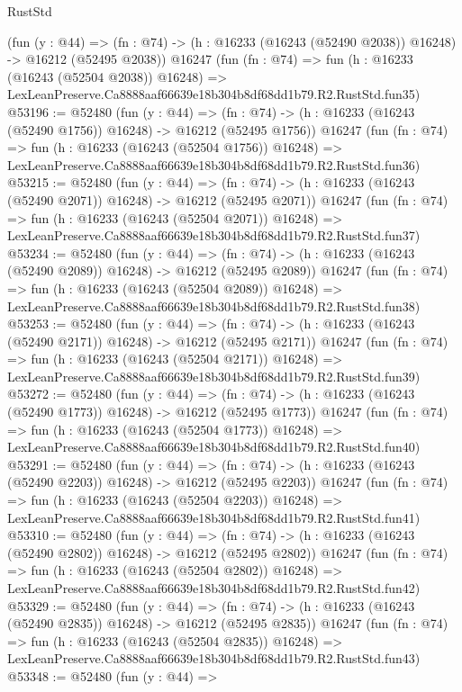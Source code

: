 \begin{lexlean}{RustStd}
\begin{coremodule}
    (fun (y : @44) =>
    (fn : @74) -> (h : @16233 (@16243 (@52490 @2038)) @16248) -> @16212 (@52495 @2038))
    @16247
    (fun (fn : @74) =>
    fun (h : @16233 (@16243 (@52504 @2038)) @16248) =>
    LexLeanPreserve.Ca8888aaf66639e18b304b8df68dd1b79.R2.RustStd.fun35)
@53196 := @52480
    (fun (y : @44) =>
    (fn : @74) -> (h : @16233 (@16243 (@52490 @1756)) @16248) -> @16212 (@52495 @1756))
    @16247
    (fun (fn : @74) =>
    fun (h : @16233 (@16243 (@52504 @1756)) @16248) =>
    LexLeanPreserve.Ca8888aaf66639e18b304b8df68dd1b79.R2.RustStd.fun36)
@53215 := @52480
    (fun (y : @44) =>
    (fn : @74) -> (h : @16233 (@16243 (@52490 @2071)) @16248) -> @16212 (@52495 @2071))
    @16247
    (fun (fn : @74) =>
    fun (h : @16233 (@16243 (@52504 @2071)) @16248) =>
    LexLeanPreserve.Ca8888aaf66639e18b304b8df68dd1b79.R2.RustStd.fun37)
@53234 := @52480
    (fun (y : @44) =>
    (fn : @74) -> (h : @16233 (@16243 (@52490 @2089)) @16248) -> @16212 (@52495 @2089))
    @16247
    (fun (fn : @74) =>
    fun (h : @16233 (@16243 (@52504 @2089)) @16248) =>
    LexLeanPreserve.Ca8888aaf66639e18b304b8df68dd1b79.R2.RustStd.fun38)
@53253 := @52480
    (fun (y : @44) =>
    (fn : @74) -> (h : @16233 (@16243 (@52490 @2171)) @16248) -> @16212 (@52495 @2171))
    @16247
    (fun (fn : @74) =>
    fun (h : @16233 (@16243 (@52504 @2171)) @16248) =>
    LexLeanPreserve.Ca8888aaf66639e18b304b8df68dd1b79.R2.RustStd.fun39)
@53272 := @52480
    (fun (y : @44) =>
    (fn : @74) -> (h : @16233 (@16243 (@52490 @1773)) @16248) -> @16212 (@52495 @1773))
    @16247
    (fun (fn : @74) =>
    fun (h : @16233 (@16243 (@52504 @1773)) @16248) =>
    LexLeanPreserve.Ca8888aaf66639e18b304b8df68dd1b79.R2.RustStd.fun40)
@53291 := @52480
    (fun (y : @44) =>
    (fn : @74) -> (h : @16233 (@16243 (@52490 @2203)) @16248) -> @16212 (@52495 @2203))
    @16247
    (fun (fn : @74) =>
    fun (h : @16233 (@16243 (@52504 @2203)) @16248) =>
    LexLeanPreserve.Ca8888aaf66639e18b304b8df68dd1b79.R2.RustStd.fun41)
@53310 := @52480
    (fun (y : @44) =>
    (fn : @74) -> (h : @16233 (@16243 (@52490 @2802)) @16248) -> @16212 (@52495 @2802))
    @16247
    (fun (fn : @74) =>
    fun (h : @16233 (@16243 (@52504 @2802)) @16248) =>
    LexLeanPreserve.Ca8888aaf66639e18b304b8df68dd1b79.R2.RustStd.fun42)
@53329 := @52480
    (fun (y : @44) =>
    (fn : @74) -> (h : @16233 (@16243 (@52490 @2835)) @16248) -> @16212 (@52495 @2835))
    @16247
    (fun (fn : @74) =>
    fun (h : @16233 (@16243 (@52504 @2835)) @16248) =>
    LexLeanPreserve.Ca8888aaf66639e18b304b8df68dd1b79.R2.RustStd.fun43)
@53348 := @52480
    (fun (y : @44) =>

\end{coremodule}
\end{lexlean}
